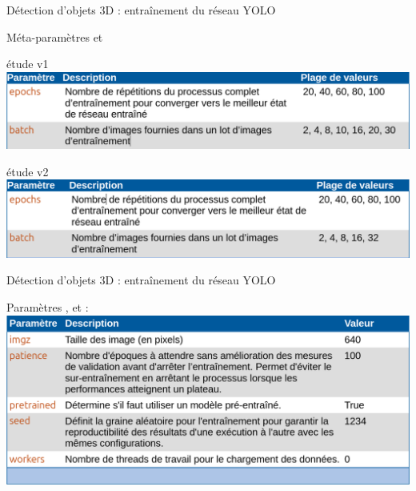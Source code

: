 \documentclass[11pt,serif,mathserif,compress,hyperref={colorlinks}]{beamer}
\begin{document}
\begin{frame}{Détection d'objets 3D : entraînement du réseau YOLO}
  
  \begin{tcolorbox}[add to width=.7cm, title={Choix des méta-paramètres d’entraînement}]
    Méta-paramètres  et 

    {\tiny étude v1}\\[1mm]
      \includegraphics[width=\textwidth]{images/ChoixMetaParamV1.png}

    {\tiny étude v2}\\[1mm]
      \includegraphics[width=\textwidth]{images/ChoixMetaParamV2.png}

  \end{tcolorbox}
    
\end{frame}

\begin{frame}{Détection d'objets 3D : entraînement du réseau YOLO}
  
  \begin{tcolorbox}[add to width=.7cm, title={Choix des paramètres d’entraînement}]
    Paramètres ,  et :\\[5mm]
   \includegraphics[width=\textwidth]{images/ChoixParam.png}
  \end{tcolorbox}
    
\end{frame}
\end{document}
